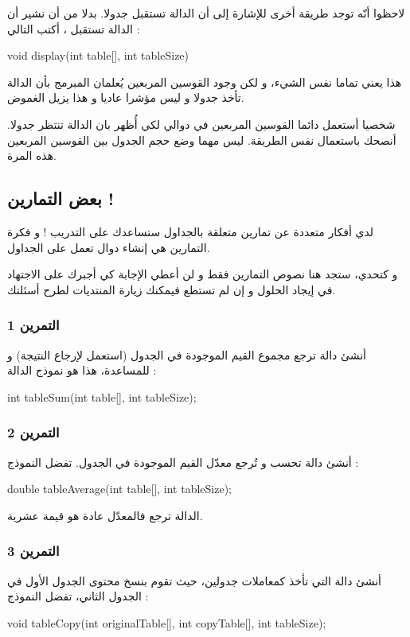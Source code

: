 لاحظوا أنّه توجد طريقة أخرى للإشارة إلى أن الدالة تستقبل جدولا. بدلا من أن نشير أن الدالة تستقبل
،
أكتب التالي :
\begin{Csource}
void display(int table[], int tableSize)
\end{Csource}
هذا يعني تماما نفس الشيء، و لكن وجود القوسين المربعين يُعلمان المبرمج بأن الدالة تأخذ جدولا و ليس مؤشرا عاديا و هذا يزيل الغموض.

شخصيا أستعمل دائما القوسين المربعين في دوالي لكي أُظهر بان الدالة تنتظر جدولا. أنصحك باستعمال نفس الطريقة. ليس مهما وضع حجم الجدول بين القوسين المربعين هذه المرة.

\subsection{بعض التمارين !}
لدي أفكار متعددة عن تمارين متعلقة بالجداول ستساعدك على التدريب ! و فكرة التمارين هي إنشاء دوال تعمل على الجداول.

و كتحدي، ستجد هنا نصوص  التمارين فقط و لن أعطي الإجابة كي أجبرك على الاجتهاد في إيجاد الحلول و إن لم تستطع فيمكنك زيارة المنتديات لطرح أسئلتك.
\subsubsection{التمرين 1}
أنشئ دالة
ترجع مجموع القيم الموجودة في الجدول (استعمل
لإرجاع النتيجة) و  للمساعدة، هذا هو نموذج  الدالة :
\begin{Csource}
int tableSum(int table[], int tableSize);
\end{Csource}
\subsubsection{التمرين 2}
أنشئ دالة
تحسب و تُرجع معدّل القيم الموجودة في الجدول. تفضل النموذج :
\begin{Csource}
double tableAverage(int table[], int tableSize);
\end{Csource}
الدالة ترجع
فالمعدّل عادة هو قيمة عشرية.
\subsubsection{التمرين 3}
أنشئ دالة
التي تأخذ كمعاملات جدولين، حيث تقوم بنسخ محتوى الجدول الأول في الجدول الثاني، تفضل النموذج :
\begin{Csource}
void tableCopy(int originalTable[], int copyTable[], int tableSize);
\end{Csource}
